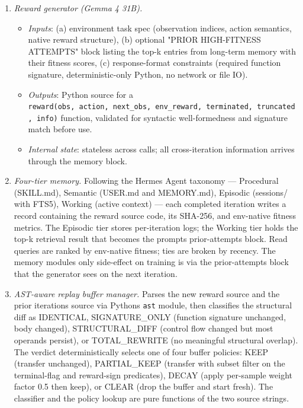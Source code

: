 \documentclass[conference,letterpaper,10pt]{IEEEtran}
\providecommand{\tightlist}{\setlength{\itemsep}{0pt}\setlength{\parskip}{0pt}}
\begin{document}
\begin{enumerate}
\def\labelenumi{\arabic{enumi}.}
\item
  \emph{Reward generator (Gemma 4 31B).}

  \begin{itemize}
  \tightlist
  \item
    \emph{Inputs}: (a) environment task spec (observation indices, action semantics, native reward structure), (b) optional "PRIOR HIGH-FITNESS ATTEMPTS" block listing the top-k entries from long-term memory with their fitness scores, (c) response-format constraints (required function signature, deterministic-only Python, no network or file IO).
  \item
    \emph{Outputs}: Python source for a \texttt{reward(obs,\ action,\ next\_obs,\ env\_reward,\ terminated,\ truncated,\ info)} function, validated for syntactic well-formedness and signature match before use.
  \item
    \emph{Internal state}: stateless across calls; all cross-iteration information arrives through the memory block.
  \end{itemize}
\item
  \emph{Four-tier memory.} Following the Hermes Agent taxonomy --- Procedural (SKILL.md), Semantic (USER.md and MEMORY.md), Episodic (sessions/ with FTS5), Working (active context) --- each completed iteration writes a record containing the reward source code, its SHA-256, and env-native fitness metrics. The Episodic tier stores per-iteration logs; the Working tier holds the top-k retrieval result that becomes the prompt\textquotesingle s prior-attempts block. Read queries are ranked by env-native fitness; ties are broken by recency. The memory module\textquotesingle s only side-effect on training is via the prior-attempts block that the generator sees on the next iteration.
\item
  \emph{AST-aware replay buffer manager.} Parses the new reward source and the prior iteration\textquotesingle s source via Python\textquotesingle s \texttt{ast} module, then classifies the structural diff as IDENTICAL, SIGNATURE\_ONLY (function signature unchanged, body changed), STRUCTURAL\_DIFF (control flow changed but most operands persist), or TOTAL\_REWRITE (no meaningful structural overlap). The verdict deterministically selects one of four buffer policies: KEEP (transfer unchanged), PARTIAL\_KEEP (transfer with subset filter on the terminal-flag and reward-sign predicates), DECAY (apply per-sample weight factor 0.5 then keep), or CLEAR (drop the buffer and start fresh). The classifier and the policy lookup are pure functions of the two source strings.
\end{enumerate}
\end{document}
